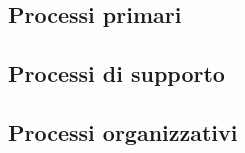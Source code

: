 \documentclass[../piano_di_qualifica.tex]{subfiles}
\begin{document}

\subsection{Processi primari}
\subsection{Processi di supporto}
\subsection{Processi organizzativi}
\end{document}
